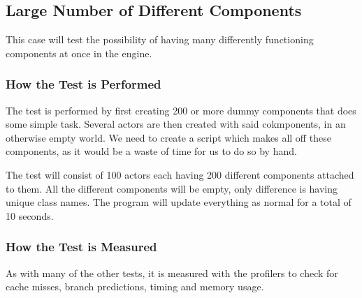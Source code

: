 \subsection{Large Number of Different Components}
This case will test the possibility of having many differently functioning components at once in the engine. 

\subsubsection*{How the Test is Performed}
The test is performed by first creating 200 or more dummy components that does some simple task. 
Several actors are then created with said cokmponents, in an otherwise empty world.
We need to create a script which makes all off these components, as it would be a waste of time for us to do so by hand.

The test will consist of 100 actors each having 200 different components attached to them.
All the different components will be empty, only difference is having unique class names.
The program will update everything as normal for a total of 10 seconds.

\subsubsection*{How the Test is Measured}
As with many of the other tests, it is measured with the profilers to check for cache misses, branch predictions, timing and memory usage.
